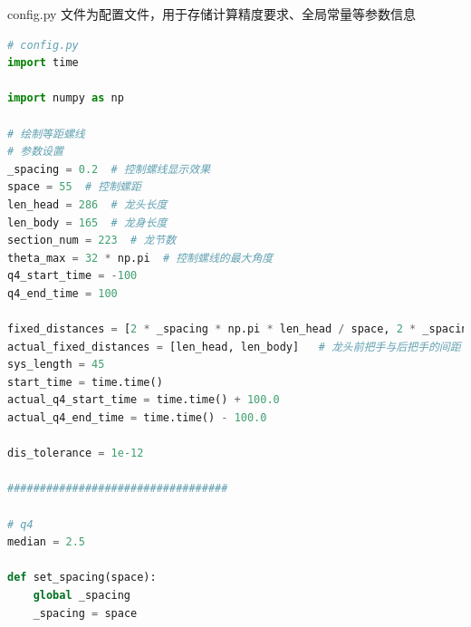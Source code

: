 \documentclass[a4paper]{article}
\begin{document}
 	config.py 文件为配置文件，用于存储计算精度要求、全局常量等参数信息
	\begin{lstlisting}[language=python,columns=fullflexible,frame=shadowbox]
# config.py
import time

import numpy as np

# 绘制等距螺线
# 参数设置
_spacing = 0.2  # 控制螺线显示效果
space = 55  # 控制螺距
len_head = 286  # 龙头长度
len_body = 165  # 龙身长度
section_num = 223  # 龙节数
theta_max = 32 * np.pi  # 控制螺线的最大角度
q4_start_time = -100
q4_end_time = 100

fixed_distances = [2 * _spacing * np.pi * len_head / space, 2 * _spacing * np.pi * len_body / space]   # 龙头前把手与后把手的间距 + 龙身与龙尾前把手与后把手的间距
actual_fixed_distances = [len_head, len_body]   # 龙头前把手与后把手的间距 + 龙身与龙尾前把手与后把手的间距
sys_length = 45
start_time = time.time()
actual_q4_start_time = time.time() + 100.0
actual_q4_end_time = time.time() - 100.0

dis_tolerance = 1e-12

##################################

# q4
median = 2.5
	
def set_spacing(space):
	global _spacing
	_spacing = space
	
	
	\end{lstlisting}
 	
\end{document}
